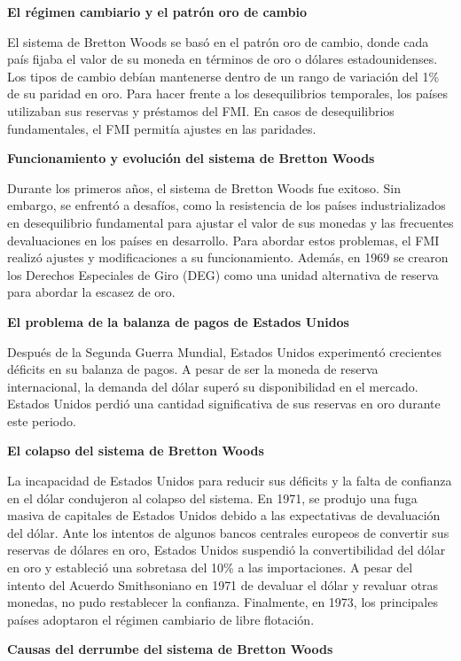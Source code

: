 \documentclass[
  jou,
  floatsintext,
  longtable,
  a4paper,
  nolmodern,
  notxfonts,
  notimes,
  12pt,
  colorlinks=true,linkcolor=blue,citecolor=blue,urlcolor=blue]{apa7}
\begin{document}
\textbf{El régimen cambiario y el patrón oro de cambio}

El sistema de Bretton Woods se basó en el patrón oro de cambio, donde
cada país fijaba el valor de su moneda en términos de oro o dólares
estadounidenses. Los tipos de cambio debían mantenerse dentro de un
rango de variación del 1\% de su paridad en oro. Para hacer frente a los
desequilibrios temporales, los países utilizaban sus reservas y
préstamos del FMI. En casos de desequilibrios fundamentales, el FMI
permitía ajustes en las paridades.

\textbf{Funcionamiento y evolución del sistema de Bretton Woods}

Durante los primeros años, el sistema de Bretton Woods fue exitoso. Sin
embargo, se enfrentó a desafíos, como la resistencia de los países
industrializados en desequilibrio fundamental para ajustar el valor de
sus monedas y las frecuentes devaluaciones en los países en desarrollo.
Para abordar estos problemas, el FMI realizó ajustes y modificaciones a
su funcionamiento. Además, en 1969 se crearon los Derechos Especiales de
Giro (DEG) como una unidad alternativa de reserva para abordar la
escasez de oro.

\textbf{El problema de la balanza de pagos de Estados Unidos}

Después de la Segunda Guerra Mundial, Estados Unidos experimentó
crecientes déficits en su balanza de pagos. A pesar de ser la moneda de
reserva internacional, la demanda del dólar superó su disponibilidad en
el mercado. Estados Unidos perdió una cantidad significativa de sus
reservas en oro durante este periodo.

\textbf{El colapso del sistema de Bretton Woods}

La incapacidad de Estados Unidos para reducir sus déficits y la falta de
confianza en el dólar condujeron al colapso del sistema. En 1971, se
produjo una fuga masiva de capitales de Estados Unidos debido a las
expectativas de devaluación del dólar. Ante los intentos de algunos
bancos centrales europeos de convertir sus reservas de dólares en oro,
Estados Unidos suspendió la convertibilidad del dólar en oro y
estableció una sobretasa del 10\% a las importaciones. A pesar del
intento del Acuerdo Smithsoniano en 1971 de devaluar el dólar y revaluar
otras monedas, no pudo restablecer la confianza. Finalmente, en 1973,
los principales países adoptaron el régimen cambiario de libre
flotación.

\textbf{Causas del derrumbe del sistema de Bretton Woods}
\end{document}
